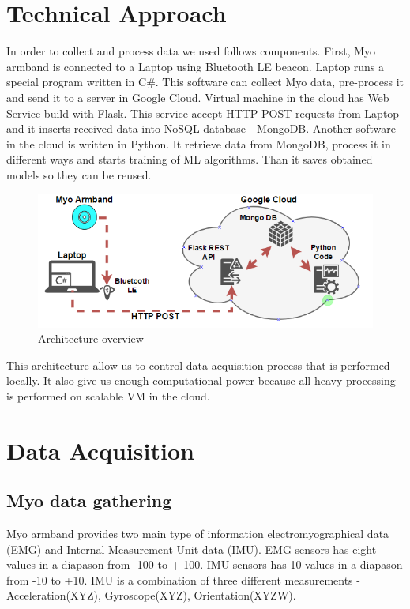 \documentclass[conference,compsoc]{IEEEtran}
\begin{document}
\section{Technical Approach}
In order to collect and process data we used follows components. First, Myo armband is connected to a Laptop using Bluetooth LE beacon. Laptop runs a special program written in C\#. This software can collect Myo data, pre-process it and send it to a server in Google Cloud. Virtual machine in the cloud has Web Service build with Flask. This service accept HTTP POST requests from Laptop and it inserts received data into NoSQL database - MongoDB. Another software in the cloud is written in Python. It retrieve data from MongoDB, process it in different ways and starts training of ML algorithms. Than it saves obtained models so they can be reused.


\begin{figure}[h]
\caption{Architecture overview}
\includegraphics[scale=0.45]{archi}
\centering
\end{figure}

This architecture allow us to control data acquisition process that is performed locally. It also give us enough computational power because all heavy processing is performed on scalable VM in the cloud.  




\section{Data Acquisition}
\subsection{Myo data gathering}

Myo armband provides two main type of information electromyographical data (EMG) and Internal Measurement Unit data (IMU). EMG sensors has eight values in a diapason from -100 to + 100. IMU sensors has 10 values in a diapason from -10 to +10. IMU is a combination of three different measurements - Acceleration(XYZ), Gyroscope(XYZ), Orientation(XYZW).
\end{document}
